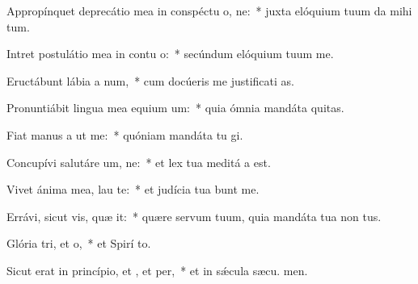 \item Appropínquet deprecátio mea in conspéctu o, ne:~* juxta elóquium tuum da mihi tum.
\item Intret postulátio mea in contu o:~* secúndum elóquium tuum  me.
\item Eructábunt lábia a num,~* cum docúeris me justificati as.
\item Pronuntiábit lingua mea equium um:~* quia ómnia mandáta  quitas.
\item Fiat manus a ut  me:~* quóniam mandáta tu gi.
\item Concupívi salutáre um, ne:~* et lex tua meditá a est.
\item Vivet ánima mea,  lau te:~* et judícia tua bunt me.
\item Errávi, sicut vis, quæ it:~* quære servum tuum, quia mandáta tua non  tus.
\item Glória tri, et o,~* et Spirí to.
\item Sicut erat in princípio, et , et per,~* et in sǽcula sæcu. men.
